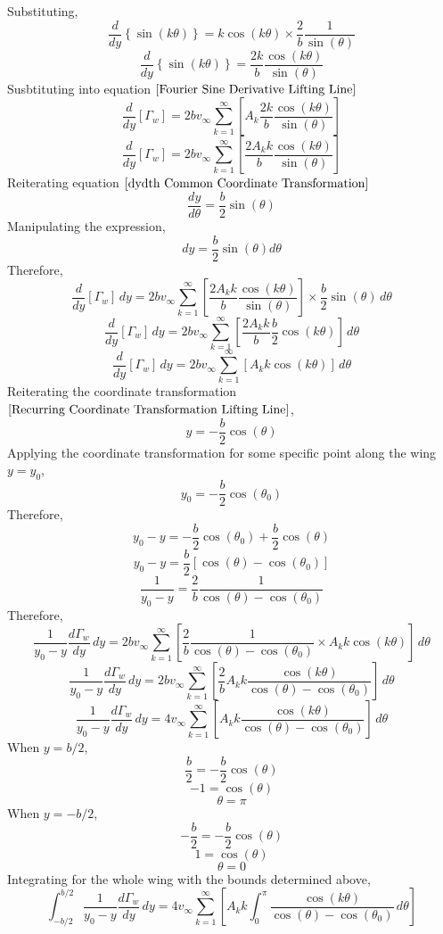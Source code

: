 \documentclass[a4paper, 12pt]{report}
\begin{document}
\begin{center}
Substituting,
$$\frac{d}{d y}\left\{\sin(k\theta)\right\} =  k\cos(k\theta) \times \frac{2}{b}\frac{1}{\sin(\theta)}$$
$$\frac{d}{d y}\left\{\sin(k\theta)\right\} =  \frac{2k}{b}\frac{\cos(k\theta)}{\sin(\theta)}$$
Susbtituting into equation $\ref{Fourier Sine Derivative Lifting Line}$
$$\frac{d}{d y}\left[\Gamma_{w}\right] =  2bv_{\infty}\sum^{\infty}_{k = 1}\left[A_{k} \frac{2k}{b}\frac{\cos(k\theta)}{\sin(\theta)} \right]$$
$$\frac{d}{d y}\left[\Gamma_{w}\right] =  2bv_{\infty}\sum^{\infty}_{k = 1}\left[\frac{2A_{k}k}{b}\frac{\cos(k\theta)}{\sin(\theta)}\right]$$
Reiterating equation $\ref{dydth Common Coordinate Transformation}$ 
$$\frac{dy}{d\theta} = \frac{b}{2}\sin(\theta)$$
Manipulating the expression,
$$dy = \frac{b}{2}\sin(\theta)d\theta$$
Therefore,
$$\frac{d}{d y}\left[\Gamma_{w}\right]\,dy =  2bv_{\infty}\sum^{\infty}_{k = 1}\left[\frac{2A_{k}k}{b}\frac{\cos(k\theta)}{\sin(\theta)}\right]\times \frac{b}{2}\sin(\theta)\,d\theta$$
$$\frac{d}{d y}\left[\Gamma_{w}\right]\,dy =  2bv_{\infty}\sum^{\infty}_{k = 1}\left[\frac{2A_{k}k}{b}\frac{b}{2} \cos(k\theta)\right] \,d\theta$$
$$\frac{d}{d y}\left[\Gamma_{w}\right]\,dy =  2bv_{\infty}\sum^{\infty}_{k = 1}\left[A_{k}k \cos(k\theta)\right] \,d\theta$$
Reiterating the coordinate transformation $\ref{Recurring Coordinate Transformation Lifting Line}$,
$$y = -\frac{b}{2}\cos(\theta)$$
Applying the coordinate transformation for some specific point along the wing $y = y_{0}$,
$$y_{0} = -\frac{b}{2}\cos(\theta_{0})$$
Therefore,
$$y_{0}-y = -\frac{b}{2}\cos(\theta_{0})+\frac{b}{2}\cos(\theta)$$
$$y_{0}-y = \frac{b}{2}\left[\cos(\theta)-\cos(\theta_{0})\right]$$
$$\frac{1}{y_{0}-y} = \frac{2}{b}\frac{1}{\cos(\theta)-\cos(\theta_{0})}$$
Therefore,
$$\frac{1}{y_{0}-y}\frac{d\Gamma_{w}}{d y}\,dy =  2bv_{\infty}\sum^{\infty}_{k = 1}\left[\frac{2}{b}\frac{1}{\cos(\theta)-\cos(\theta_{0})}\times A_{k}k \cos(k\theta)\right] \,d\theta$$
$$\frac{1}{y_{0}-y}\frac{d\Gamma_{w}}{d y}\,dy =  2bv_{\infty}\sum^{\infty}_{k = 1}\left[\frac{2}{b}A_{k}k\frac{\cos(k\theta)}{\cos(\theta)-\cos(\theta_{0})}\right] \,d\theta$$
$$\frac{1}{y_{0}-y}\frac{d\Gamma_{w}}{d y}\,dy =  4v_{\infty}\sum^{\infty}_{k = 1}\left[A_{k}k\frac{\cos(k\theta)}{\cos(\theta)-\cos(\theta_{0})}\right] \,d\theta$$
When $y = b/2$,
$$\frac{b}{2} = -\frac{b}{2}\cos(\theta)$$
$$-1 = \cos(\theta)$$
$$\theta = \pi$$
When $y = -b/2$,
$$-\frac{b}{2} = -\frac{b}{2}\cos(\theta)$$
$$1 = \cos(\theta)$$
$$\theta = 0$$
Integrating for the whole wing with the bounds determined above,
$$\int^{b/2}_{-b/2}\frac{1}{y_{0}-y}\frac{d\Gamma_{w}}{d y}\,dy =  4v_{\infty}\sum^{\infty}_{k = 1}\left[A_{k}k \int^{\pi}_{0}\frac{\cos(k\theta)}{\cos(\theta)-\cos(\theta_{0})}\,d\theta\right] $$

\end{center}
\end{document}
